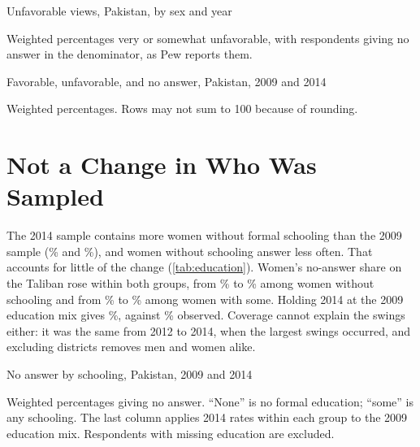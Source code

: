 \documentclass[11pt,letterpaper]{article}
\newcommand{\TableStyle}{\normalsize\setlength{\tabcolsep}{6pt}\renewcommand{\arraystretch}{1}}
\newcommand{\tablenote}[1]{\par\smallskip\begin{minipage}{\linewidth}\footnotesize #1\end{minipage}}
\begin{document}
\begin{table}[htbp]
\centering\TableStyle
\caption{Unfavorable views, Pakistan, by sex and year}
\label{tab:unfavorable}
\begin{adjustbox}{max width=\linewidth}

\end{adjustbox}
\tablenote{Weighted percentages very or somewhat unfavorable, with respondents giving no answer in the denominator, as Pew reports them.}
\end{table}

\begin{table}[htbp]
\centering\TableStyle
\caption{Favorable, unfavorable, and no answer, Pakistan, 2009 and 2014}
\label{tab:answers}
\begin{adjustbox}{max width=\linewidth}

\end{adjustbox}
\tablenote{Weighted percentages. Rows may not sum to 100 because of rounding.}
\end{table}

\section{Not a Change in Who Was Sampled}

The 2014 sample contains more women without formal schooling than the 2009 sample (\WomenNoSchoolingOld{}\% and \WomenNoSchooling{}\%), and women without schooling answer less often. That accounts for little of the change (\cref{tab:education}). Women's no-answer share on the Taliban rose within both groups, from \WomenTalibanNoneOld{}\% to \WomenTalibanNone{}\% among women without schooling and from \WomenTalibanSomeOld{}\% to \WomenTalibanSome{}\% among women with some. Holding 2014 at the 2009 education mix gives \WomenTalibanStandardized{}\%, against \WomenTaliban{}\% observed. Coverage cannot explain the swings either: it was the same from 2012 to 2014, when the largest swings occurred, and excluding districts removes men and women alike.

\begin{table}[htbp]
\centering\TableStyle
\caption{No answer by schooling, Pakistan, 2009 and 2014}
\label{tab:education}
\begin{adjustbox}{max width=\linewidth}

\end{adjustbox}
\tablenote{Weighted percentages giving no answer. ``None'' is no formal education; ``some'' is any schooling. The last column applies 2014 rates within each group to the 2009 education mix. Respondents with missing education are excluded.}
\end{table}
\end{document}
